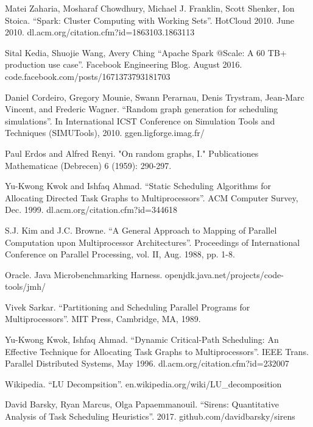 \documentclass[11pt, oneside]{article}   	%
\begin{document}
\newpage
\begin{thebibliography}{}

Matei Zaharia, Mosharaf Chowdhury, Michael J. Franklin, Scott Shenker, Ion Stoica. ``Spark: Cluster Computing with Working Sets''. HotCloud 2010. June 2010. dl.acm.org/citation.cfm?id=1863103.1863113

Sital Kedia, Shuojie Wang, Avery Ching  ``Apache Spark @Scale: A 60 TB+ production use case''. Facebook Engineering Blog. August 2016. code.facebook.com/posts/1671373793181703

Daniel Cordeiro, Gregory Mounie, Swann Perarnau, Denis Trystram, Jean-Marc Vincent, and Frederic Wagner. ``Random graph generation for scheduling simulations''. In International ICST Conference on Simulation Tools and Techniques (SIMUTools), 2010. ggen.ligforge.imag.fr/

Paul Erdos and Alfred Renyi. "On random graphs, I." Publicationes Mathematicae (Debrecen) 6 (1959): 290-297.

Yu-Kwong Kwok and Ishfaq Ahmad. ``Static Scheduling Algorithms for Allocating Directed Task Graphs to Multiprocessors''. ACM Computer Survey, Dec. 1999. dl.acm.org/citation.cfm?id=344618

S.J. Kim and J.C. Browne. ``A General Approach to Mapping of Parallel Computation upon Multiprocessor Architectures''. Proceedings of International Conference on Parallel Processing, vol. II, Aug. 1988, pp. 1-8.

Oracle. Java Microbenchmarking Harness. openjdk.java.net/projects/code-tools/jmh/

Vivek Sarkar. ``Partitioning and Scheduling Parallel Programs for Multiprocessors''. MIT Press, Cambridge, MA, 1989.

Yu-Kwong Kwok, Ishfaq Ahmad. ``Dynamic Critical-Path Scheduling: An Effective Technique for Allocating Task Graphs to Multiprocessors''. IEEE Trans. Parallel Distributed Systems, May 1996. dl.acm.org/citation.cfm?id=232007

Wikipedia. ``LU Decompsition''. en.wikipedia.org/wiki/LU\_decomposition

David Barsky, Ryan Marcus, Olga Papaemmanouil. ``Sirens: Quantitative Analysis of Task Scheduling Heuristics''. 2017. github.com/davidbarsky/sirens

\end{thebibliography}{}
\end{document}
